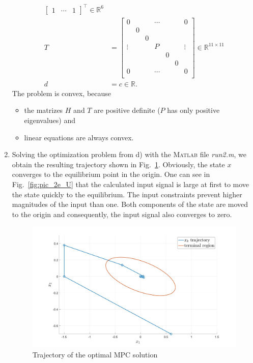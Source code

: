 \documentclass[12pt,pdftex,a4paper]{scrartcl}
\newcommand{\set}[1]{\mathbb{#1}}
\begin{document}
\begin{enumerate}
\begin{align*}
\begin{bmatrix}
			1 & \cdots & 1
		\end{bmatrix}^\top
		\in \set{R}^{6}	\\
		T &=
		\begin{bmatrix}
			0 & & & \cdots & & & 0 \\
			& 0 & & & & & \\
			& & 0 & & & & \\
			\vdots & & & P & & & \vdots \\
			& & & & 0 & & \\
			& & & & & 0 & \\
			0 & & & \cdots & & & 0 \\
		\end{bmatrix}
		\in \set{R}^{11 \times 11} \\
		d &= c \in \set{R}.
	\end{align*}
    The problem is convex, because 
    \begin{itemize}
    \item the matrizes $H$ and $T$ are positive definite ($P$ has only positive eigenvalues) and
    \item linear equations are always convex.
    \end{itemize}        
    
    \item Solving the optimization problem from d) with the \textsc{Matlab} file \emph{run2.m}, we obtain the resulting trajectory shown in Fig.~\ref{fig:pic_2e_X}. Obviously, the state $x$ converges to the equilibrium point in the origin. One can see in Fig.~\ref{fig:pic_2e_U} that the calculated input signal is large at first to move the state quickly to the equilibrium. The input constraints prevent higher magnitudes of the input than one. Both components of the state are moved to the origin and consequently, the input signal also converges to zero.
    \begin{figure}[H]
	\centering
	\includegraphics[scale=0.2]{pics/prop_2e_X.jpg}
	\caption{Trajectory of the optimal MPC solution}	
	\label{fig:pic_2e_X}
    \end{figure}


\end{enumerate}
\end{document}
